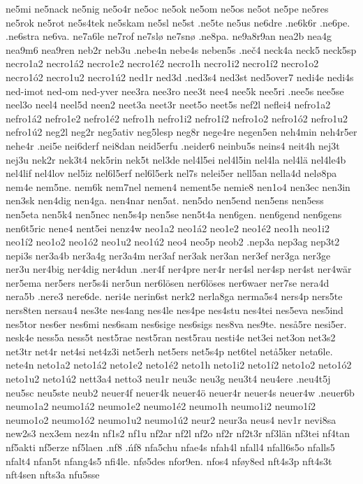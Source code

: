 {{ne5mi
ne5nack
ne5nig
ne5o4r
ne5oc
ne5ok
ne5om
ne5os
ne5ot
ne5pe
ne5res
ne5rok
ne5rot
ne5s4tek
ne5skam
ne5sl
ne5st
.ne5te
ne5us
ne6dre
.ne6k6r
.ne6pe.
.ne6stra
ne6va.
ne7a6le
ne7rof
ne7slø
ne7snø
.ne8pa.
ne9a8r9an
nea2b
nea4g
nea9m6
nea9ren
neb2r
neb3u
.nebe4n
nebe4s
neben5s
.neč4
neck4a
neck5
neck5sp
necro1a2
necro1á2
necro1e2
necro1é2
necro1h
necro1i2
necro1í2
necro1o2
necro1ó2
necro1u2
necro1ú2
ned1r
ned3d
.ned3s4
ned3st
ned5over7
nedi4e
nedi4s
ned-imot
ned-om
ned-yver
nee3ra
nee3ro
nee3t
nee4
nee5k
nee5ri
.nee5s
nee5se
neel3o
neel4
neel5d
neen2
neet3a
neet3r
neet5o
neet5s
nef2l
neflei4
nefro1a2
nefro1á2
nefro1e2
nefro1é2
nefro1h
nefro1i2
nefro1í2
nefro1o2
nefro1ó2
nefro1u2
nefro1ú2
neg2l
neg2r
neg5ativ
neg5lesp
neg8r
nege4re
negen5en
neh4min
neh4r5er
nehe4r
.nei5e
nei6derf
nei8dan
neid5erfu
.neider6
neinbu5s
neins4
neit4h
nej3t
nej3u
nek2r
nek3t4
nek5rin
nek5t
nel3de
nel4l5ei
nel4l5in
nel4la
nel4lä
nel4le4b
nel4lif
nel4lov
nel5iz
nel6l5erf
nel6l5erk
nel7s
nelei5er
nell5an
nella4d
nelø8pa
nem4e
nem5ne.
nem6k
nem7nel
nemen4
nement5e
nemie8
nen1o4
nen3ec
nen3in
nen3sk
nen4dig
nen4ga.
nen4nar
nen5at.
nen5do
nen5end
nen5ens
nen5ess
nen5eta
nen5k4
nen5nec
nen5s4p
nen5se
nen5t4a
nen6gen.
nen6gend
nen6gens
nen6t5ric
nene4
nent5ei
nenz4w
neo1a2
neo1á2
neo1e2
neo1é2
neo1h
neo1i2
neo1í2
neo1o2
neo1ó2
neo1u2
neo1ú2
neo4
neo5p
neob2
.nep3a
nep3ag
nep3t2
nepi3s
ner3a4b
ner3a4g
ner3a4m
ner3af
ner3ak
ner3an
ner3ef
ner3ga
ner3ge
ner3u
ner4big
ner4dig
ner4dun
.ner4f
ner4pre
ner4r
ner4sl
ner4sp
ner4st
ner4wär
ner5ema
ner5ers
ner5s4i
ner5un
ner6lösen
ner6löses
ner6waer
ner7se
nera4d
nera5b
.nere3
nere6de.
neri4e
nerin6st
nerk2
nerla8ga
nerma5s4
ners4p
ners5te
ners8ten
nersau4
nes3te
nes4ang
nes4le
nes4pe
nes4stu
nes4tei
nes5eva
nes5ind
nes5tor
nes6er
nes6mi
nes6sam
nes6sige
nes6sigs
nes8va
nes9te.
neså5re
nesi5er.
nesk4e
ness5a
ness5t
nest5rae
nest5ran
nest5rau
nesti4e
net3ei
net3on
net3s2
net3tr
net4r
net4si
net4z3i
net5erh
net5ers
net5s4p
net6tel
netå5ker
neta6le.
nete4n
neto1a2
neto1á2
neto1e2
neto1é2
neto1h
neto1i2
neto1í2
neto1o2
neto1ó2
neto1u2
neto1ú2
nett3a4
netto3
neu1r
neu3c
neu3g
neu3t4
neu4ere
.neu4t5j
neu5sc
neu5ste
neub2
neuer4f
neuer4k
neuer4ö
neuer4r
neuer4s
neuer4w
.neuer6b
neumo1a2
neumo1á2
neumo1e2
neumo1é2
neumo1h
neumo1i2
neumo1í2
neumo1o2
neumo1ó2
neumo1u2
neumo1ú2
neur2
neur3a
neus4
nev1r
nevi8sa
new2s3
nex3em
nez4n
nf1s2
nf1u
nf2ar
nf2l
nf2o
nf2r
nf2t3r
nf3län
nf3tei
nf4tan
nf5akti
nf5erze
nf5laen
.nf8
.ńf8
nfa5chu
nfae4s
nfah4l
nfall4
nfall6s5o
nfalls5
nfalt4
nfan5t
nfang4s5
nfi4le.
nfø5des
nfor9en.
nfos4
nføy8ed
nft4s3p
nft4s3t
nft4sen
nfts3a
nfu5sse
}}
